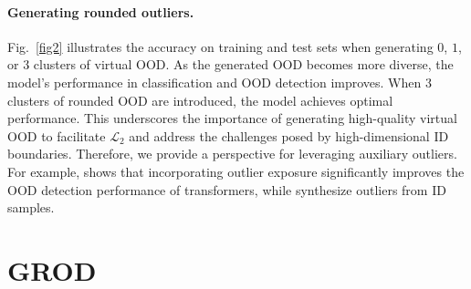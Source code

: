 \documentclass{article}
\theoremstyle{plain}
\theoremstyle{definition}
\theoremstyle{remark}
\begin{document}
\vspace{-0.8em}

\paragraph{Generating rounded outliers.}
Fig.~\ref{fig2} illustrates the accuracy on training and test sets when generating $0$, $1$, or $3$ clusters of virtual OOD. As the generated OOD becomes more diverse, the model's performance in classification and OOD detection improves. When 3 clusters of rounded OOD are introduced, the model achieves optimal performance. This underscores the importance of generating high-quality virtual OOD to facilitate $\mathcal{L}_2$ and address the challenges posed by high-dimensional ID boundaries. Therefore, we provide a perspective for leveraging auxiliary outliers. For example, \citet{fort2021exploring} shows that incorporating outlier exposure significantly improves the OOD detection performance of transformers, while \citet{du2022vos, tao2023non} synthesize outliers from ID samples. 

\section{\textsc{GROD}}\label{GROD algorithm}
\end{document}
